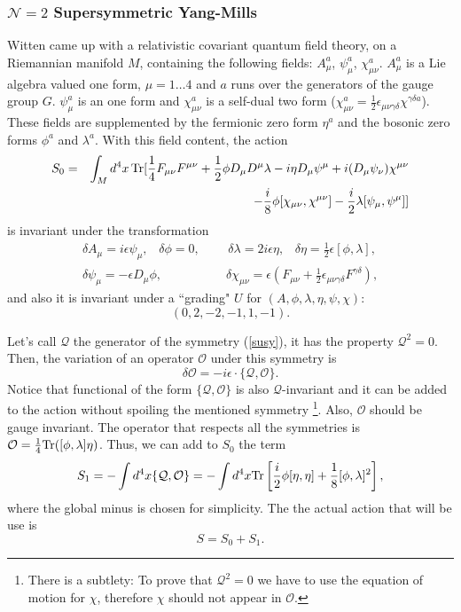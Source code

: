 \documentclass[12pt, onecolumn]{article}
\begin{document}
\subsubsection{$\mathcal{N}=2$ Supersymmetric Yang-Mills}
Witten came up with a relativistic covariant quantum field theory, on a Riemannian manifold $M$, containing the following fields: $A_\mu^a$, $\psi^a_\mu$, $\chi_{\mu\nu}^a$.  $A_\mu^a$ is a Lie algebra valued one form, $\mu=1\ldots4$ and $a$ runs over the generators of the gauge group $G$.  $\psi^a_\mu$ is an one form and $\chi^a_{\mu\nu}$ is a self-dual two form ($\chi^a_{\mu\nu}=\frac{1}{2}\epsilon_{\mu\nu\gamma\delta}\chi^{\gamma\delta a}$). These fields are supplemented by the fermionic zero form $\eta^a$ and the bosonic zero forms $\phi^a$ and $\lambda^a$.  With this field content, the action 
\begin{eqnarray}
S_0&=&\int_M d^4x\,{\rm Tr}[\frac{1}{4}F_{\mu\nu}F^{\mu\nu}+\frac{1}{2}\phi D_\mu D^\mu \lambda-i \eta D_\mu\psi^\mu+i(D_\mu\psi_\nu)\chi^{\mu\nu}\nonumber\\&&-\frac{i}{8}\phi[\chi_{\mu\nu},\chi^{\mu\nu}]- \frac{i}{2}\lambda[\psi_\mu,\psi^\mu] ] \label{L}
\end{eqnarray}
is invariant under the transformation
\begin{eqnarray}
\delta A_\mu=i \epsilon \psi_\mu,\,\,\,\,\,\delta \phi = 0,\,\,\,&&\,\delta \lambda=2i \epsilon \eta, \,\,\,\,\, \delta \eta = \frac{1}{2}\epsilon[\phi,\lambda], \nonumber \\
\delta \psi_\mu=-\epsilon D_\mu \phi,\,\,\,\,\,&& \delta \chi_{\mu\nu}= \epsilon(F_{\mu\nu}+\frac{1}{2}\epsilon_{\mu\nu\gamma\delta}F^{\gamma\delta}),\label{susy}
\end{eqnarray}
and also it is invariant under a ``grading" $U$ for $(A, \phi, \lambda, \eta, \psi, \chi)$: $$(0, 2, -2, -1, 1, -1).$$

Let's call $\mathcal{Q}$ the generator of the symmetry (\ref{susy}), it has the property $\mathcal{Q}^2=0$. Then, the variation of an operator $\mathcal{O}$ under this symmetry is 
\begin{equation}
\delta \mathcal{O} = -i\epsilon \cdot \{\mathcal{Q},\mathcal{O}\}. \label{transf}
\end{equation}
Notice that functional of the form $\{\mathcal{Q},\mathcal{O}\}$ is also $\mathcal{Q}$-invariant and it can be added to the action without spoiling the mentioned symmetry \footnote{There is a subtlety: To prove that $\mathcal{Q}^2=0$ we have to use the equation of motion for $\chi$, therefore $\chi$ should not appear in $\mathcal{O}$.}. Also, $\mathcal{O}$ should be gauge invariant. The operator that respects all the symmetries is $\mathcal{O}=\frac{1}{4}{\rm Tr}([\phi,\lambda]\eta)$. Thus, we can add to $S_0$ the term
\begin{equation}
S_1=-\int d^4x\{\mathcal{Q},\mathcal{O}\}=-\int d^4x {\rm Tr} \left[ \frac{i}{2}\phi [\eta,\eta] +\frac{1}{8}[\phi,\lambda]^2\right], \label{L1}
\end{equation} where the global minus is chosen for simplicity. The the actual action that will be use is 
\begin{equation}
 S = S_0+S_1. \label{L12}
\end{equation}
\end{document}
